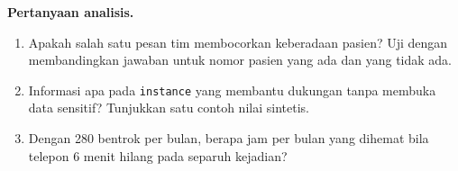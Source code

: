 \textbf{Pertanyaan analisis.}
\begin{enumerate}
  \item Apakah salah satu pesan tim membocorkan keberadaan pasien? Uji dengan membandingkan jawaban untuk nomor pasien yang ada dan yang tidak ada.
  \item Informasi apa pada \texttt{instance} yang membantu dukungan tanpa membuka data sensitif? Tunjukkan satu contoh nilai sintetis.
  \item Dengan 280 bentrok per bulan, berapa jam per bulan yang dihemat bila telepon 6 menit hilang pada separuh kejadian?
\end{enumerate}
